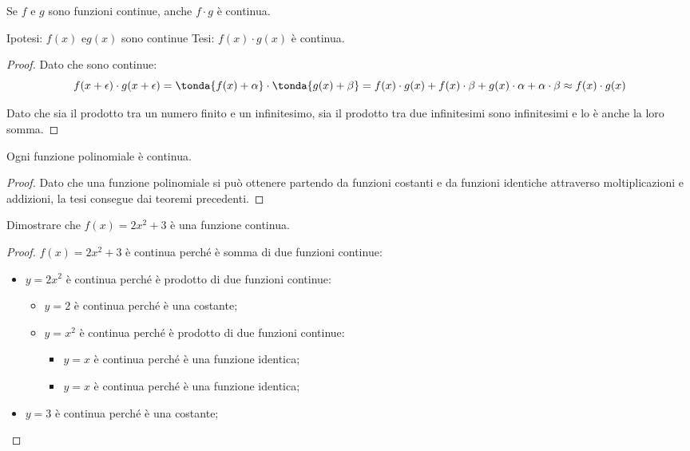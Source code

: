 \begin{teorema}
Se \(f\) e \(g\) sono funzioni continue, anche \(f \cdot g\) è continua.
\end{teorema}

\noindent Ipotesi: 
\(f(x) \text{ e} g(x)\) sono continue
\tab Tesi: 
\(f(x) \cdot g(x)\) è continua.

\begin{proof}
Dato che sono continue: 
\[f(x+\epsilon) \cdot g(x+\epsilon) = 
\tonda{f(x)+\alpha} \cdot \tonda{g(x)+\beta} = 
f(x) \cdot g(x) + f(x) \cdot \beta + g(x) \cdot \alpha + \alpha \cdot \beta
\approx f(x) \cdot g(x)\]

Dato che sia il prodotto tra un numero finito e un infinitesimo, sia il 
prodotto tra due infinitesimi sono infinitesimi e lo è anche la loro somma. 
\end{proof}

\begin{corollario}
 Ogni funzione polinomiale è continua.
\end{corollario}

\begin{proof}
Dato che una funzione polinomiale si può ottenere partendo da funzioni 
costanti e da funzioni identiche attraverso moltiplicazioni e addizioni, 
la tesi consegue dai teoremi precedenti. 
\end{proof}

\begin{esempio}
 Dimostrare che \(f(x)=2x^2 + 3\) è una funzione continua.

\begin{proof}

\(f(x)=2x^2 + 3\) è continua perché è somma di due funzioni continue: 
 \begin{itemize}[nosep]
  \item \(y=2x^2\) è continua perché è prodotto di due funzioni continue:
  \begin{itemize}[nosep]
   \item \(y=2\) è continua perché è una costante;
   \item \(y=x^2\) è continua perché è prodotto di due funzioni continue:
   \begin{itemize}[nosep]
    \item \(y=x\) è continua perché è una funzione identica;
    \item \(y=x\) è continua perché è una funzione identica;
   \end{itemize}
  \end{itemize}
  \item \(y=3\) è continua perché è una costante;
 \end{itemize}
\end{proof}

\end{esempio}

